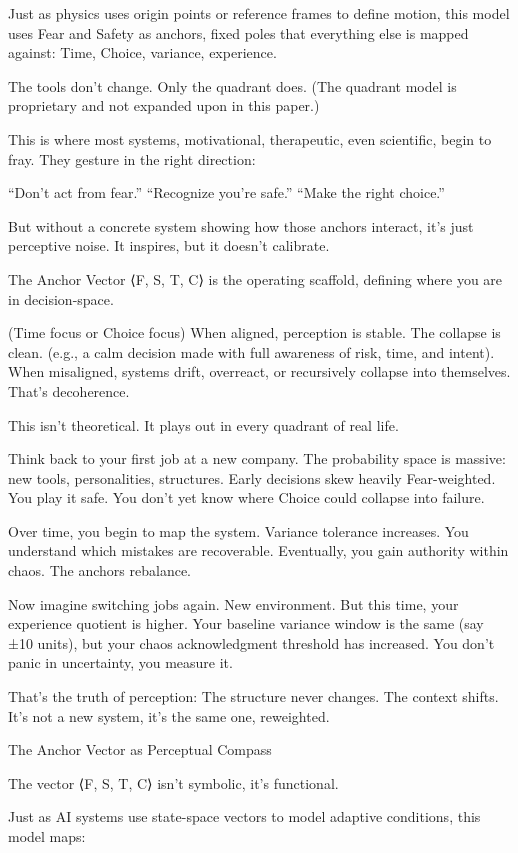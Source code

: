 \documentclass[11pt]{article}
\begin{document}
Just as physics uses origin points or reference frames to define motion, this model uses Fear and Safety as anchors, fixed poles that everything else is mapped against: Time, Choice, variance, experience.

The tools don’t change. Only the quadrant does. (The quadrant model is proprietary and not expanded upon in this paper.)

This is where most systems, motivational, therapeutic, even scientific, begin to fray. They gesture in the right direction:

“Don’t act from fear.”
“Recognize you’re safe.”
“Make the right choice.”

But without a concrete system showing how those anchors interact, it’s just perceptive noise. It inspires, but it doesn’t calibrate.

The Anchor Vector ⟨F, S, T, C⟩ is the operating scaffold, defining where you are in decision-space.

(Time focus or Choice focus) 
When aligned, perception is stable. The collapse is clean. (e.g., a calm decision made with full awareness of risk, time, and intent). 
When misaligned, systems drift, overreact, or recursively collapse into themselves. That’s decoherence.

This isn’t theoretical. It plays out in every quadrant of real life.

Think back to your first job at a new company. The probability space is massive: new tools, personalities, structures. Early decisions skew heavily Fear-weighted. You play it safe. You don’t yet know where Choice could collapse into failure.

Over time, you begin to map the system. Variance tolerance increases. You understand which mistakes are recoverable. Eventually, you gain authority within chaos. The anchors rebalance.

Now imagine switching jobs again. New environment. But this time, your experience quotient is higher. Your baseline variance window is the same (say ±10 units), but your chaos acknowledgment threshold has increased. You don’t panic in uncertainty, you measure it.

That’s the truth of perception: The structure never changes. The context shifts.
It’s not a new system, it’s the same one, reweighted.


The Anchor Vector as Perceptual Compass

The vector ⟨F, S, T, C⟩ isn’t symbolic, it’s functional.

Just as AI systems use state-space vectors to model adaptive conditions, this model maps:
\end{document}
